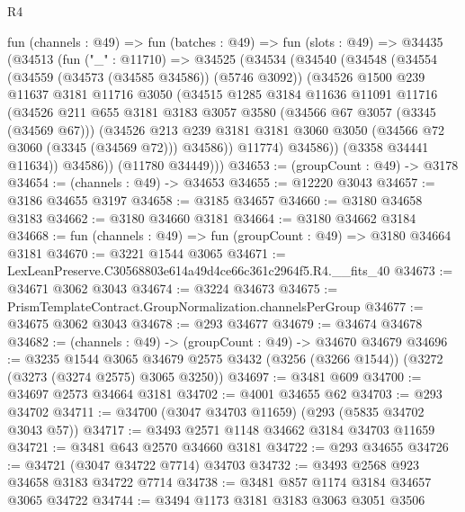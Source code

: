 \begin{lexlean}{R4}
\begin{coremodule}
  fun (channels : @49) =>
  fun (batches : @49) =>
  fun (slots : @49) =>
  @34435
    (@34513
      (fun ("_" : @11710) =>
      @34525
        (@34534
          (@34540
            (@34548
              (@34554
                (@34559 (@34573 (@34585 @34586)) (@5746 @3092))
                (@34526
                  @1500
                  @239
                  @11637
                  @3181
                  @11716
                  @3050
                  (@34515
                    @1285
                    @3184
                    @11636
                    @11091
                    @11716
                    (@34526
                      @211
                      @655
                      @3181
                      @3183
                      @3057
                      @3580
                      (@34566 @67 @3057 (@3345 (@34569 @67)))
                      (@34526
                        @213
                        @239
                        @3181
                        @3181
                        @3060
                        @3050
                        (@34566 @72 @3060 (@3345 (@34569 @72)))
                        @34586))
                    @11774)
                  @34586))
              (@3358 @34441 @11634))
            @34586))
        (@11780 @34449)))
@34653 := (groupCount : @49) -> @3178
@34654 := (channels : @49) -> @34653
@34655 := @12220 @3043
@34657 := @3186 @34655 @3197
@34658 := @3185 @34657
@34660 := @3180 @34658 @3183
@34662 := @3180 @34660 @3181
@34664 := @3180 @34662 @3184
@34668 := fun (channels : @49) => fun (groupCount : @49) => @3180 @34664 @3181
@34670 := @3221 @1544 @3065
@34671 := LexLeanPreserve.C30568803e614a49d4ce66c361c2964f5.R4.__fits_40
@34673 := @34671 @3062 @3043
@34674 := @3224 @34673
@34675 := PrismTemplateContract.GroupNormalization.channelsPerGroup
@34677 := @34675 @3062 @3043
@34678 := @293 @34677
@34679 := @34674 @34678
@34682 := (channels : @49) -> (groupCount : @49) -> @34670 @34679
@34696 := @3235
    @1544
    @3065
    @34679
    @2575
    @3432
    (@3256 (@3266 @1544))
    (@3272 (@3273 (@3274 @2575) @3065 @3250))
@34697 := @3481 @609
@34700 := @34697 @2573 @34664 @3181
@34702 := @4001 @34655 @62
@34703 := @293 @34702
@34711 := @34700 (@3047 @34703 @11659) (@293 (@5835 @34702 @3043 @57))
@34717 := @3493 @2571 @1148 @34662 @3184 @34703 @11659
@34721 := @3481 @643 @2570 @34660 @3181
@34722 := @293 @34655
@34726 := @34721 (@3047 @34722 @7714) @34703
@34732 := @3493 @2568 @923 @34658 @3183 @34722 @7714
@34738 := @3481 @857 @1174 @3184 @34657 @3065 @34722
@34744 := @3494 @1173 @3181 @3183 @3063 @3051 @3506

\end{coremodule}
\end{lexlean}
